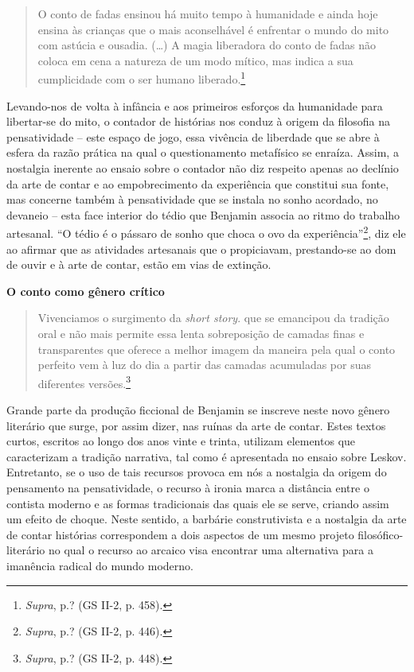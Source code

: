 \begin{quote}
O conto de fadas ensinou há muito tempo à humanidade e ainda hoje ensina
às crianças que o mais aconselhável é enfrentar o mundo do mito com
astúcia e ousadia. (\ldots{}) A magia liberadora do conto de fadas não coloca
em cena a natureza de um modo mítico, mas indica a sua cumplicidade com
o ser humano liberado.\footnote{\emph{Supra}, p.? (GS II-2, p. 458).}
\end{quote}

Levando-nos de volta à infância e aos primeiros esforços da humanidade
para libertar-se do mito, o contador de histórias nos conduz à origem da
filosofia na pensatividade -- este espaço de jogo, essa vivência de
liberdade que se abre à esfera da razão prática na qual o questionamento
metafísico se enraíza. Assim, a nostalgia inerente ao ensaio sobre o
contador não diz respeito apenas ao declínio da arte de contar e ao
empobrecimento da experiência que constitui sua fonte, mas concerne
também à pensatividade que se instala no sonho acordado, no devaneio --
esta face interior do tédio que Benjamin associa ao ritmo do trabalho
artesanal. ``O tédio é o pássaro de sonho que choca o ovo da
experiência''\footnote{\emph{Supra}, p.? (GS II-2, p. 446).}, diz ele ao
afirmar que as atividades artesanais que o propiciavam, prestando-se ao
dom de ouvir e à arte de contar, estão em vias de extinção.

\textbf{O conto como gênero crítico}

\begin{quote}
Vivenciamos o surgimento da \emph{short story}. que se emancipou da
tradição oral e não mais permite essa lenta sobreposição de camadas
finas e transparentes que oferece a melhor imagem da maneira pela qual o
conto perfeito vem à luz do dia a partir das camadas acumuladas por suas
diferentes versões.\footnote{\emph{Supra}, p.? (GS II-2, p. 448).}
\end{quote}

Grande parte da produção ficcional de Benjamin se inscreve neste novo
gênero literário que surge, por assim dizer, nas ruínas da arte de
contar. Estes textos curtos, escritos ao longo dos anos vinte e trinta,
utilizam elementos que caracterizam a tradição narrativa, tal como é
apresentada no ensaio sobre Leskov. Entretanto, se o uso de tais
recursos provoca em nós a nostalgia da origem do pensamento na
pensatividade, o recurso à ironia marca a distância entre o contista
moderno e as formas tradicionais das quais ele se serve, criando assim
um efeito de choque. Neste sentido, a barbárie construtivista e a
nostalgia da arte de contar histórias correspondem a dois aspectos de um
mesmo projeto filosófico-literário no qual o recurso ao arcaico visa
encontrar uma alternativa para a imanência radical do mundo moderno.


